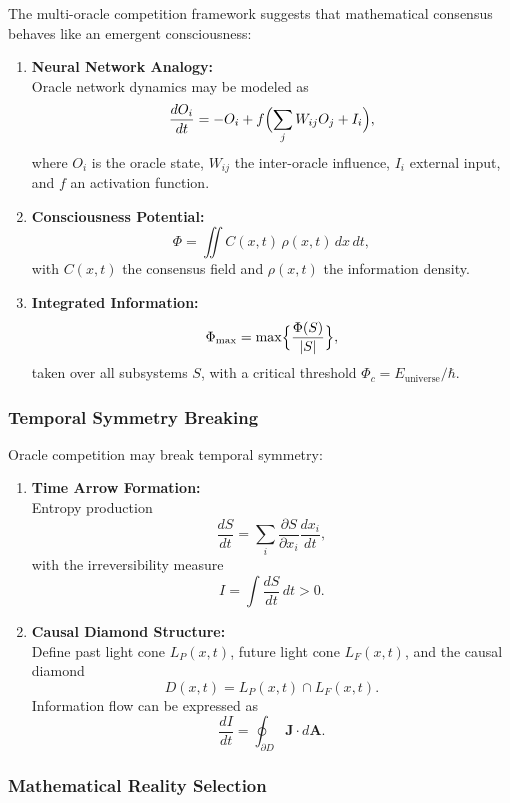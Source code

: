\documentclass[11pt]{article}
\begin{document}
The multi-oracle competition framework suggests that mathematical consensus behaves like an emergent consciousness:
\begin{enumerate}[label=(\arabic*)]
    \item \textbf{Neural Network Analogy:} \\
    Oracle network dynamics may be modeled as
    \[
    \frac{dO_i}{dt}=-O_i+f\Bigl(\sum_j W_{ij}O_j+I_i\Bigr),
    \]
    where $O_i$ is the oracle state, $W_{ij}$ the inter-oracle influence, $I_i$ external input, and $f$ an activation function.
    \item \textbf{Consciousness Potential:} \\
    \[
    \Phi=\iint C(x,t)\,\rho(x,t)\,dx\,dt,
    \]
    with $C(x,t)$ the consensus field and $\rho(x,t)$ the information density.
    \item \textbf{Integrated Information:} \\
    \[
    \Phi_{\max} = \max\Bigl\{\frac{\Phi(S)}{|S|}\Bigr\},
    \]
    taken over all subsystems $S$, with a critical threshold $\Phi_c = E_{\text{universe}}/\hbar$.
\end{enumerate}

\subsubsection{Temporal Symmetry Breaking}

Oracle competition may break temporal symmetry:
\begin{enumerate}[label=(\arabic*)]
    \item \textbf{Time Arrow Formation:} \\
    Entropy production
    \[
    \frac{dS}{dt} = \sum_i \frac{\partial S}{\partial x_i}\frac{dx_i}{dt},
    \]
    with the irreversibility measure
    \[
    I = \int \frac{dS}{dt}\, dt > 0.
    \]
    \item \textbf{Causal Diamond Structure:} \\
    Define past light cone $L_P(x,t)$, future light cone $L_F(x,t)$, and the causal diamond 
    \[
    D(x,t)=L_P(x,t)\cap L_F(x,t).
    \]
    Information flow can be expressed as 
    \[
    \frac{dI}{dt}=\oint_{\partial D} \mathbf{J}\cdot d\mathbf{A}.
    \]
\end{enumerate}

\subsubsection{Mathematical Reality Selection}
\end{document}
